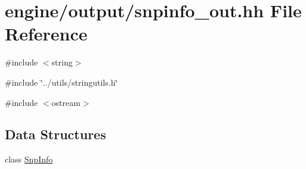 \hypertarget{snpinfo__out_8hh}{
\section{engine/output/snpinfo\_\-out.hh File Reference}
\label{snpinfo__out_8hh}
}
{\ttfamily \#include $<$string$>$}\par
{\ttfamily \#include \char`\"{}../utils/stringutils.h\char`\"{}}\par
{\ttfamily \#include $<$ostream$>$}\par
\subsection*{Data Structures}
\begin{DoxyCompactItemize}
\item 
class \hyperlink{classSnpInfo}{SnpInfo}
\end{DoxyCompactItemize}
